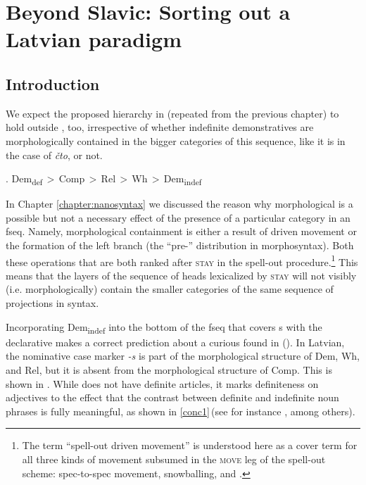 \chapter{Beyond Slavic: Sorting out a Latvian paradigm}\label{chapter:latvian}


\section{Introduction}
We expect the proposed hierarchy in \Next (repeated from the previous chapter) to hold outside , too, irrespective of whether  indefinite demonstratives are morphologically contained in the bigger categories of this sequence, like it is in the case of  \textit{\v{c}to}, or not.

\ex.\label{milito} 
Dem\textsubscript{def}\,$>$\,Comp\,$>$\,Rel\,$>$\,Wh\,$>$\,Dem\textsubscript{indef}

\noindent In Chapter \ref{chapter:nanosyntax} we discussed the reason why morphological  is a possible but not a necessary effect of the presence of a particular category in an fseq.  Namely, morphological containment is either a result of  driven movement or the formation of the left branch (the ``pre-'' distribution in morphosyntax). Both these operations that are both ranked after \textsc{stay} in the spell-out procedure.\footnote{The term ``spell-out driven movement'' is understood here as a cover term for all three kinds of movement subsumed in the  \textsc{move} leg of the spell-out scheme: spec-to-spec movement, snowballing, and .
} %
This means that the layers of the sequence of heads lexicalized by \textsc{stay} will not visibly (i.e. morphologically) contain the smaller categories of the same sequence of projections in syntax.
\par
Incorporating Dem\textsubscript{indef} into the bottom of the fseq that covers s with the declarative  makes a correct prediction about a curious  found in  (). In Latvian, the nominative case marker \textit{-s} is part of the morphological structure of Dem, Wh, and Rel, but it is absent from the morphological structure of Comp.  This is shown in . While   does not have definite articles, it marks definiteness on adjectives to the effect that the contrast between definite and indefinite noun phrases is fully meaningful, as shown in \ref{conc1}\,(see for instance \citealt{Budina1966,Nau1998,Praulins2012}, among others).\pagebreak

